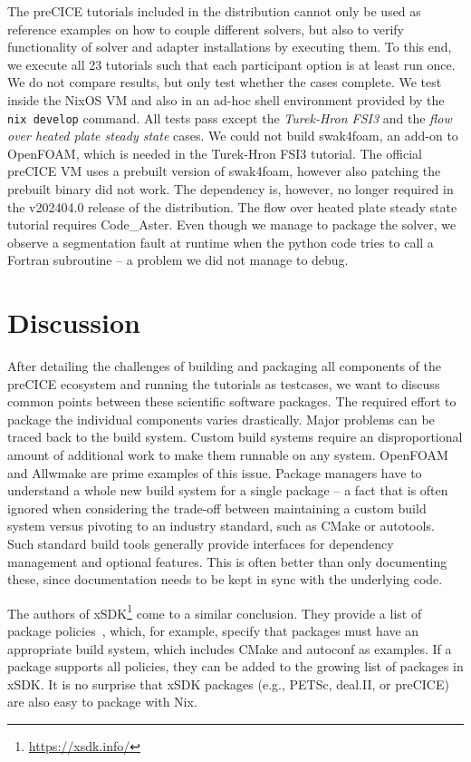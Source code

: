 \documentclass{eceasst}
\begin{document}
The preCICE tutorials included in the distribution cannot only be used as reference examples on how to couple different solvers, but also to verify functionality of solver and adapter installations by executing them.
To this end, we execute all 23 tutorials such that each participant option is at least run once. We do not compare results, but only test whether the cases complete.
We test inside the NixOS VM and also in an ad-hoc shell environment provided by the \texttt{nix develop} command. All tests pass except the \textit{Turek-Hron FSI3} and the \textit{flow over heated plate steady state} cases.
We could not build swak4foam, an add-on to OpenFOAM, which is needed in the Turek-Hron FSI3 tutorial.
The official preCICE VM uses a prebuilt version of swak4foam, however also patching the prebuilt binary did not work.
The dependency is, however, no longer required in the v202404.0 release of the distribution.
The flow over heated plate steady state tutorial requires Code\_Aster. Even though we manage to package the solver, we observe a segmentation fault at runtime when the python code tries to call a Fortran subroutine -- a problem we did not manage to debug.

\section{Discussion}

After detailing the challenges of building and packaging all components of the preCICE ecosystem and running the tutorials as testcases, we want to discuss common points between these scientific software packages.
The required effort to package the individual components varies drastically. Major problems can be traced back to the build system.
Custom build systems require an disproportional amount of additional work to make them runnable on any system.
OpenFOAM and Allwmake are prime examples of this issue. Package managers have to understand a whole new build system for a single package -- a fact that is often ignored when considering the trade-off between maintaining a custom build system versus pivoting to an industry standard, such as CMake or autotools.
Such standard build tools generally provide interfaces for dependency management and optional features. This is often better than only documenting these, since documentation needs to be kept in sync with the underlying code.

The authors of xSDK\footnote{\url{https://xsdk.info/}} come to a similar conclusion.
They provide a list of package policies~\cite{xSDK2023}, which, for example, specify that packages must have an appropriate build system, which includes CMake and autoconf as examples.
If a package supports all policies, they can be added to the growing list of packages in xSDK.
It is no surprise that xSDK packages (e.g., PETSc, deal.II, or preCICE) are also easy to package with Nix.
\end{document}
